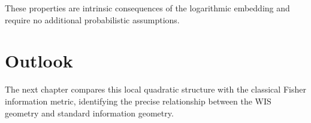 These properties are intrinsic consequences of the logarithmic embedding
and require no additional probabilistic assumptions.

\section{Outlook}

The next chapter compares this local quadratic structure with the
classical Fisher information metric, identifying the precise
relationship between the WIS geometry and standard information geometry.

